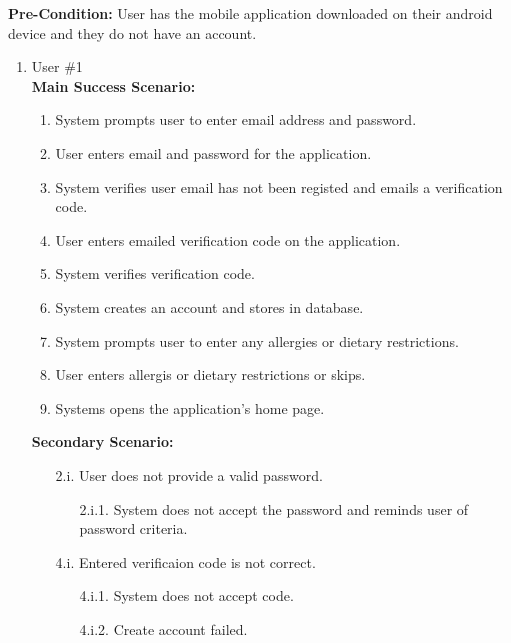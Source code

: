 \documentclass[]{article}
\begin{document}
\begin{enumerate}[{\bf BE1.}]
	\textbf{Pre-Condition:} User has the mobile application downloaded on their android device and they do not have an account.
		\begin{enumerate}[{\bf VP1.}]
			\item User \#1 \\
				\textbf{Main Success Scenario:} 
				\begin{enumerate}[{1.}]
					\item System prompts user to enter email address and password.
					\item User enters email and password for the application.
					\item System verifies user email has not been registed and emails a verification code.
					\item User enters emailed verification code on the application.
					\item System verifies verification code.
					\item System creates an account and stores in database.
					\item System prompts user to enter any allergies or dietary restrictions.
					\item User enters allergis or dietary restrictions or skips.
					\item Systems opens the application's home page.
				\end{enumerate}
				\textbf{Secondary Scenario:}
				\begin{enumerate}
					\item[2.i.] User does not provide a valid password.
					\begin{enumerate}
						\item[2.i.1.] System does not accept the password and reminds user of password criteria.
					\end{enumerate}
				\end{enumerate}
				\begin{enumerate}
					\item[4.i.] Entered verificaion code is not correct.
					\begin{enumerate}
						\item[4.i.1.] System does not accept code.
						\item[4.i.2.] Create account failed.
					\end{enumerate}
				\end{enumerate}


\end{enumerate}
\end{enumerate}
\end{document}
